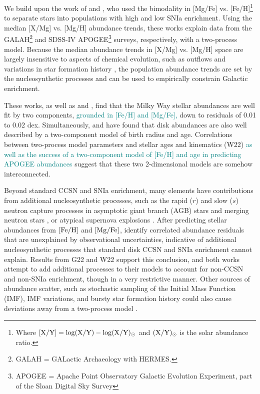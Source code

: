 \documentclass[modern]{aastex631}
\newcommand{\mgfe}[0]{[{\rm Mg/Fe}]}
\newcommand{\feh}[0]{[{\rm Fe/H}]}
\newcommand{\add}[1]{\textcolor{teal}{#1}}
\begin{document}
We build upon the work of \citet[][hereafter G22]{griffith2019, griffith2022} and \citet[][hereafter W19, W22]{weinberg2019, weinberg2022}, who used the bimodality in [Mg/Fe] vs. [Fe/H]\footnote{Where $[{\rm X}/{\rm Y}] = \log({\rm X}/{\rm Y}) - \log({\rm X}/{\rm Y})_{\odot}$ and $({\rm X}/{\rm Y})_{\odot}$ is the solar abundance ratio.} \citep[e.g.,][]{fuhrmann1998, bensby2003, adibekyan2012} to separate stars into populations with high and low SNIa enrichment. Using the median [X/Mg] vs. [Mg/H] abundance trends, these works explain data from the GALAH\footnote{GALAH = GALactic Archaeology with HERMES.} and SDSS-IV APOGEE\footnote{APOGEE = Apache Point Observatory Galactic Evolution Experiment, part of the Sloan Digital Sky Survey} surveys, respectively, with a two-process model. Because the median abundance trends in [X/Mg] vs. [Mg/H] space are largely insensitive to aspects of chemical evolution, such as outflows and variations in star formation history \citep{weinberg2019}, the population abundance trends are set by the nucleosynthetic processes and can be used to empirically constrain Galactic enrichment. 

These works, as well as \citet{ting2022} and \citet{ratcliffe2023}, find that the Milky Way stellar abundances are well fit by two components, \add{grounded in [Fe/H] and [Mg/Fe],} down to residuals of 0.01 to 0.02 dex. Simultaneously, \citet{frankel2018} and \citet{ness2022} have found that disk abundances are also well described by a two-component model of birth radius and age. Correlations between two-process model parameters and stellar ages and kinematics (W22) \add{as well as the success of a two-component model of [Fe/H] and age in predicting APOGEE abundances \citep{ness2019}} suggest that these two 2-dimensional models are somehow interconnected. 

Beyond standard CCSN and SNIa enrichment, many elements have contributions from additional nucleosynthetic processes, such as the rapid ($r$) and slow ($s$) neutron capture processes \citep[e.g.,][]{arlandini1999, bisterzo2014} in asymptotic giant branch (AGB) stars \citep[e.g.,][]{simmerer2004, karakas2016} and merging neutron stars \citep[e.g.,][]{kilpatrick2017}, or atypical supernova explosions \citep[e.g.,][]{nomoto2013}. After predicting stellar abundances from $\feh$ and $\mgfe$, \citet{ting2022} identify correlated abundance residuals that are unexplained by observational uncertainties, indicative of additional nucleosynthetic processes that standard disk CCSN and SNIa enrichment cannot explain. Results from G22 and W22 support this conclusion, and both works attempt to add additional processes to their models to account for non-CCSN and non-SNIa enrichment, though in a very restrictive manner. Other sources of abundance scatter, such as stochastic sampling of the Initial Mass Function (IMF), IMF variations, and bursty star formation history could also cause deviations away from a two-process model \citep{belokurov2018, griffith2023}.
\end{document}
